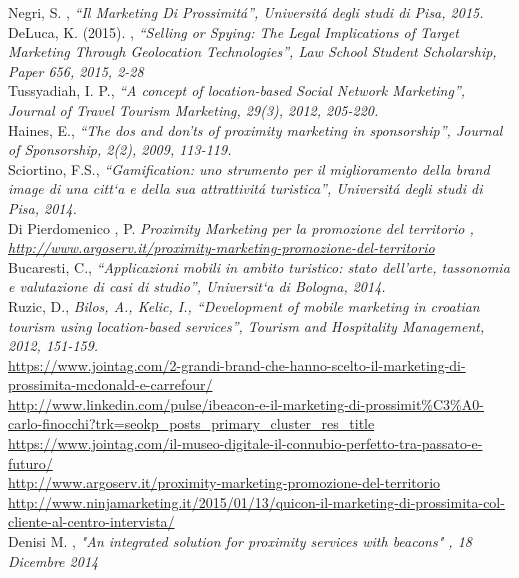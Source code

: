 \begin{thebibliography}{100}
 Negri, S. ,\emph{ “Il Marketing Di Prossimit\'a”, Universit\'a degli studi di Pisa, 2015.}\\[0.2cm]
 DeLuca, K. (2015). , \emph{“Selling or Spying: The Legal Implications of Target Marketing
Through Geolocation Technologies”, Law School Student Scholarship, Paper 656,
2015, 2-28}\\[0.2cm]
 Tussyadiah, I. P., \emph{“A concept of location-based Social Network Marketing”, Journal
of Travel Tourism Marketing, 29(3), 2012, 205-220.}\\[0.2cm]
 Haines, E.,\emph{ “The dos and don’ts of proximity marketing in sponsorship”, Journal of Sponsorship, 2(2), 2009, 113-119.}\\[0.2cm]
 Sciortino, F.S., \emph{“Gamification: uno strumento per il miglioramento della brand image di una citt`a e della sua attrattivit\'a turistica”, Universit\'a degli studi di Pisa, 2014.}\\[0.2cm]
 Di Pierdomenico , P. \emph{ Proximity Marketing per la promozione del territorio , \url{http://www.argoserv.it/proximity-marketing-promozione-del-territorio}}\\[0.2cm]
 Bucaresti, C., \emph{ “Applicazioni mobili in ambito turistico: stato dell’arte, tassonomia
e valutazione di casi di studio”, Universit`a di Bologna, 2014.}\\[0.2cm]
 Ruzic, D., \emph{ Bilos, A., Kelic, I., “Development of mobile marketing in croatian tourism using location-based services”, Tourism and Hospitality Management, 2012, 151-159.}\\[0.2cm]

\url{https://www.jointag.com/2-grandi-brand-che-hanno-scelto-il-marketing-di-prossimita-mcdonald-e-carrefour/}\\



\url{http://www.linkedin.com/pulse/ibeacon-e-il-marketing-di-prossimit\%C3\%A0-carlo-finocchi?trk=seokp_posts_primary_cluster_res_title}\\

\url{https://www.jointag.com/il-museo-digitale-il-connubio-perfetto-tra-passato-e-futuro/}\\

\url{http://www.argoserv.it/proximity-marketing-promozione-del-territorio}\\

\url{http://www.ninjamarketing.it/2015/01/13/quicon-il-marketing-di-prossimita-col-cliente-al-centro-intervista/}\\

 Denisi M. , \emph{"An integrated solution for proximity services with beacons" , 18 Dicembre 2014}\\[0.2cm]

\end{thebibliography}


